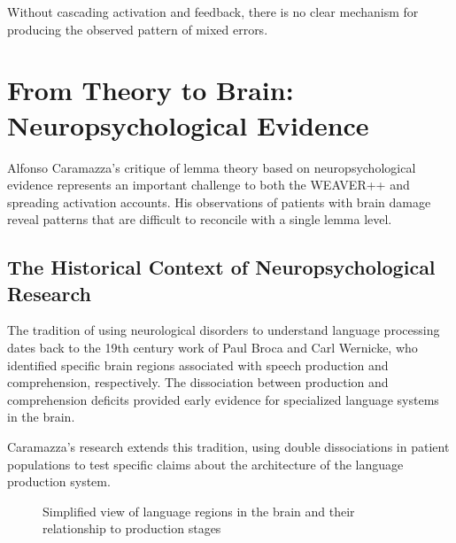 \documentclass[12pt,a4paper]{article}
\begin{document}
Without cascading activation and feedback, there is no clear mechanism for producing the observed pattern of mixed errors.

\section{From Theory to Brain: Neuropsychological Evidence}

Alfonso Caramazza's critique of lemma theory based on neuropsychological evidence represents an important challenge to both the WEAVER++ and spreading activation accounts. His observations of patients with brain damage reveal patterns that are difficult to reconcile with a single lemma level.

\subsection{The Historical Context of Neuropsychological Research}

The tradition of using neurological disorders to understand language processing dates back to the 19th century work of Paul Broca and Carl Wernicke, who identified specific brain regions associated with speech production and comprehension, respectively. The dissociation between production and comprehension deficits provided early evidence for specialized language systems in the brain.

Caramazza's research extends this tradition, using double dissociations in patient populations to test specific claims about the architecture of the language production system.

\begin{figure}[h]
\centering
{}
\caption{Simplified view of language regions in the brain and their relationship to production stages}
\label{fig:brain_language}
\end{figure}
\end{document}
